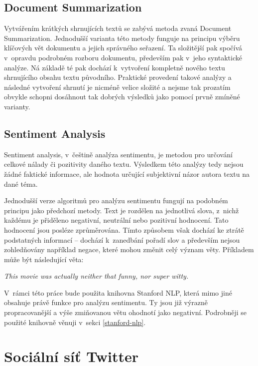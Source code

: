 \documentclass[thesis=B,czech]{FITthesis}[2012/06/26]
\begin{document}
\subsection{Document Summarization}
	Vytvářením krátkých shrnujících textů se zabývá metoda zvaná Document Summarization. Jednodušší varianta této metody funguje na principu výběru klíčových vět dokumentu a jejich správného seřazení. Ta složitější pak spočívá v~opravdu podrobném rozboru dokumentu, především pak v~jeho syntaktické analýze. Ná základě té pak dochází k~vytvoření kompletně nového textu shrnujícího obsahu textu původního. Praktické provedení takové analýzy a následné vytvoření shrnutí je nicméně velice složité a nejsme tak prozatím obvykle schopni dosáhnout tak dobrých výsledků jako pomocí prvně zmíněné varianty\cite{summarization-quora}. 


\subsection{Sentiment Analysis}
\label{sentiment-analysis}
	Sentiment analysis, v~češtině analýza sentimentu, je metodou pro určování celkové nálady či pozitivity daného textu. Výsledkem této analýzy tedy nejsou žádné faktické informace, ale hodnota určující subjektivní názor autora textu na dané téma. 
	
	Jednodušší verze algoritmů pro analýzu sentimentu fungují na podobném principu jako předchozí metody. Text je rozdělen na jednotlivá slova, z~nichž každému je přiděleno negativní, neutrální nebo pozitivní hodnocení. Tato hodnocení jsou posléze zprůměrována. Tímto způsobem však dochází ke ztrátě podstatných informací -- dochází k~zanedbání pořadí slov a především nejsou zohledňovány například negace, které mohou změnit celý význam věty. Příkladem může být následující věta:

\vspace{\baselineskip}
\textit{This movie was actually neither that funny, nor super witty.}	
\vspace{\baselineskip}

	V~rámci této práce bude použita knihovna Stanford NLP\cite{stanford-nlp-web}, která mimo jiné obsahuje právě funkce pro analýzu sentimentu. Ty jsou již výrazně propracovanější a výše zmiňovanou větu ohodnotí jako negativní. Podrobněji se použité knihovně věnuji v~sekci \ref{stanford-nlp}.


\section{Sociální síť Twitter}
\label{twitter}
	
\end{document}
